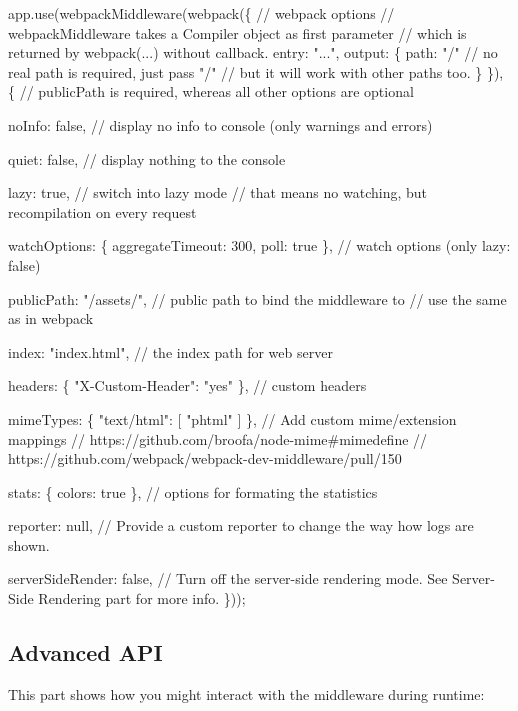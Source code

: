 \begin{DoxyCode}
app.use(webpackMiddleware(webpack(\{
    // webpack options
    // webpackMiddleware takes a Compiler object as first parameter
    // which is returned by webpack(...) without callback.
    entry: "...",
    output: \{
        path: "/"
        // no real path is required, just pass "/"
        // but it will work with other paths too.
    \}
\}), \{
    // publicPath is required, whereas all other options are optional

    noInfo: false,
    // display no info to console (only warnings and errors)

    quiet: false,
    // display nothing to the console

    lazy: true,
    // switch into lazy mode
    // that means no watching, but recompilation on every request

    watchOptions: \{
        aggregateTimeout: 300,
        poll: true
    \},
    // watch options (only lazy: false)

    publicPath: "/assets/",
    // public path to bind the middleware to
    // use the same as in webpack

    index: "index.html",
    // the index path for web server

    headers: \{ "X-Custom-Header": "yes" \},
    // custom headers

    mimeTypes: \{ "text/html": [ "phtml" ] \},
    // Add custom mime/extension mappings
    // https://github.com/broofa/node-mime#mimedefine
    // https://github.com/webpack/webpack-dev-middleware/pull/150

    stats: \{
        colors: true
    \},
    // options for formating the statistics

    reporter: null,
    // Provide a custom reporter to change the way how logs are shown.

    serverSideRender: false,
    // Turn off the server-side rendering mode. See Server-Side Rendering part for more info.
\}));
\end{DoxyCode}


\subsection*{Advanced A\+PI}

This part shows how you might interact with the middleware during runtime\+:


